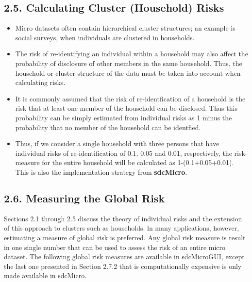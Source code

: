 \documentclass[]{article}
\begin{document}
\subsection*{2.5. Calculating Cluster (Household) Risks}
\begin{itemize}
\item Micro datasets often contain hierarchical cluster structures; an example is social
surveys, when individuals are clustered in households. 
\item The risk of re-identifying
an individual within a household may also affect the probability of disclosure of
other members in the same household. Thus, the household or cluster-structure of
the data must be taken into account when calculating risks.

\item It is commonly assumed that the risk of re-identﬁcation of a household is the risk
that at least one member of the household can be disclosed. Thus this probability
can be simply estimated from individual risks as 1 minus the probability that no
member of the household can be identﬁed. 
\item Thus, if we consider a single household
with three persons that have individual risks of re-identiﬁcation of 0.1, 0.05 and
0.01, respectively, the risk-measure for the entire household will be calculated as
1-(0.1+0.05+0.01). This is also the implementation strategy from \textbf{sdcMicro}.
\end{itemize}
\newpage
\subsection*{2.6. Measuring the Global Risk}

Sections 2.1 through 2.5 discuss the theory of individual risks and the extension
of this approach to clusters such as households. ln many applications, however,
estimating a measure of global risk is preferred. Any global risk measure is result
in one single number that can be used to assess the risk of an entire micro dataset.
The following global risk measures are available in sdcMicroGUI, except the last
one presented in Section 2.7.2 that is computationally expensive is only made
available in sdcMicro.
\end{document}
